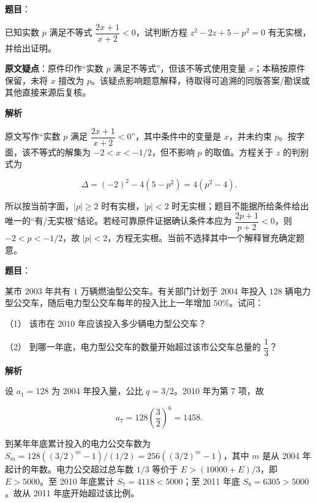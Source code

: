 \begin{answer}

\textbf{题目}：

已知实数 $p$ 满足不等式 $\dfrac{2x+1}{x+2}<0$，试判断方程 $z^2-2z+5-p^2=0$ 有无实根，并给出证明。

\begin{gktip}
\textbf{原文疑点}：原件印作“实数 $p$ 满足不等式”，但该不等式使用变量 $x$；本稿按原件保留，未将 $x$ 擅改为 $p$。该疑点影响题意解释，待取得可追溯的同版答案/勘误或其他直接来源后复核。
\end{gktip}

\textbf{解析}

原文写作“实数 $p$ 满足 $\dfrac{2x+1}{x+2}<0$”，其中条件中的变量是 $x$，并未约束 $p$。按字面，该不等式的解集为 $-2<x<-1/2$，但不影响 $p$ 的取值。方程关于 $z$ 的判别式为

\nopagebreak[4]
\[\Delta=(-2)^2-4(5-p^2)=4(p^2-4).\]

所以按当前字面，$|p|\ge2$ 时有实根，$|p|<2$ 时无实根；题目不能据所给条件给出唯一的“有/无实根”结论。若经可靠原件证据确认条件本应为 $\dfrac{2p+1}{p+2}<0$，则 $-2<p<-1/2$，故 $|p|<2$，方程无实根。当前不选择其中一个解释冒充确定题意。


\end{answer}
\begin{answer}

\textbf{题目}：

某市 $2003$ 年共有 $1$ 万辆燃油型公交车。有关部门计划于 $2004$ 年投入 $128$ 辆电力型公交车，随后电力型公交车每年的投入比上一年增加 $50\%$。试问：

（1） 该市在 $2010$ 年应该投入多少辆电力型公交车？

（2） 到哪一年底，电力型公交车的数量开始超过该市公交车总量的 $\dfrac{1}{3}$？

\textbf{解析}


设 $a_1=128$ 为 2004 年投入量，公比 $q=3/2$。2010 年为第 $7$ 项，故

\nopagebreak[4]
\[a_7=128\left(\frac32\right)^6=1458.\]


到某年年底累计投入的电力公交车数为 $S_m=128((3/2)^m-1)/(1/2)=256((3/2)^m-1)$，其中 $m$ 是从 2004 年起计的年数。电力公交超过总车数 $1/3$ 等价于 $E>(10000+E)/3$，即 $E>5000$。至 2010 年底累计 $S_7=4118<5000$；至 2011 年底 $S_8=6305>5000$。故从 2011 年底开始超过该比例。



\end{answer}
